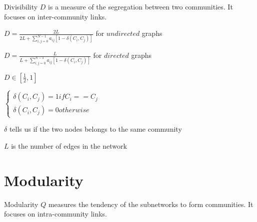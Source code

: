 \documentclass[12pt]{article}
\begin{document}
Divisibility $D$ is a measure of the segregation between two communities. It focuses on inter-community links.

\begin{center}

	$D = \frac{2L}{2L + \sum_{i, j = 0}^{N - 1}a_{ij}[1 - \delta (C_i, C_j)]}$ for $undirected$ graphs

	\vspace{20px}

	$D = \frac{L}{L + \sum_{i, j = 0}^{N - 1}a_{ij}[1 - \delta (C_i, C_j)]}$ for $directed$ graphs

	\vspace{20px}

	$D \in [\frac{1}{2}, 1]$

	\vspace{20px}

	$\begin{cases}
		
		\delta (C_i, C_j) = 1 if C_i == C_j \\

		\delta (C_i, C_j) = 0 otherwise

	\end{cases}$

	\vspace{20px}

	$\delta$ tells us if the two nodes belongs to the same community

	$L$ is the number of edges in the network

\end{center}

\newpage

\section{Modularity}

Modularity $Q$ measures the tendency of the subnetworks to form communities. It focuses on intra-community links.
\end{document}
